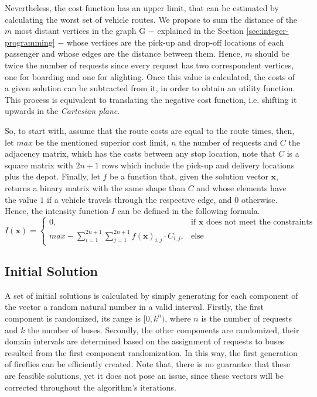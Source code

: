 \documentclass[tuberlin,cic,tc,openright,english,noabntcite,oneside]{iiufrgs}
\begin{document}
Nevertheless, the cost function has an upper limit, that can be estimated by calculating the worst set of vehicle routes. We propose to sum the distance of the $m$ most distant vertices in the graph G $-$ explained in the Section \ref{sec:integer-programming} $-$ whose vertices are the pick-up and drop-off locations of each passenger and whose edges are the distance between them. Hence, $m$ should be twice the number of requests since every request has two correspondent vertices, one for boarding and one for alighting. Once this value is calculated, the costs of a given solution can be subtracted from it, in order to obtain an utility function. This process is equivalent to translating the negative cost function, i.e. shifting it upwards in the \emph{Cartesian plane}.

So, to start with, assume that the route costs are equal to the route times, then, let $max$ be the mentioned superior cost limit, $n$ the number of requests and $C$ the adjacency matrix, which has the costs between any stop location, note that $C$ is a square matrix with $2n+1$ rows which include the pick-up and delivery locations plus the depot. Finally, let $f$ be a function that, given the solution vector $\mathbf{x}$, returns a binary matrix with the same shape than $C$ and whose elements have the value $1$ if a vehicle travels through the respective edge, and $0$ otherwise. Hence, the intensity function $I$ can be defined in the following formula.
$$I(\mathbf{x}) = \begin{cases} 0, & \text{if }\mathbf{x}\text{ does not meet the constraints}\\
								max - \displaystyle\sum_{i=1}^{2n+1}\sum_{j=1}^{2n+1} f(\mathbf{x})_{i,j} \cdot C_{i,j}, & \text{else}
					\end{cases}$$

\subsection{Initial Solution}
A set of initial solutions is calculated by simply generating for each component of the vector a random natural number in a valid interval. Firstly, the first component is randomized, its range is $[0, k^n)$, where $n$ is the number of requests and $k$ the number of buses. Secondly, the other components are randomized, their domain intervals are determined based on the assignment of requests to buses resulted from the first component randomization. In this way, the first generation of fireflies can be efficiently created. Note that, there is no guarantee that these are feasible solutions, yet it does not pose an issue, since these vectors will be corrected throughout the algorithm's iterations.
\end{document}
